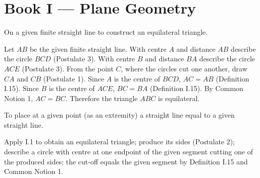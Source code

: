 %
%

\section{Book I --- Plane Geometry}
\label{sec:book-I}

\begin{claim}
\label{prop:I.1}
On a given finite straight line to construct an equilateral triangle.
\end{claim}

\begin{evidence}[Proof of I.1]
\label{ev:I.1}

Let $AB$ be the given finite straight line.  With centre $A$ and
distance $AB$ describe the circle $BCD$ (Postulate 3).  With centre
$B$ and distance $BA$ describe the circle $ACE$ (Postulate 3).  From
the point $C$, where the circles cut one another, draw $CA$ and $CB$
(Postulate 1).  Since $A$ is the centre of $BCD$, $AC = AB$
(Definition I.15).  Since $B$ is the centre of $ACE$, $BC = BA$
(Definition I.15).  By Common Notion 1, $AC = BC$.  Therefore the
triangle $ABC$ is equilateral.
\end{evidence}

\begin{claim}
\label{prop:I.2}
To place at a given point (as an extremity) a straight line equal to a
given straight line.
\end{claim}
\begin{evidence}[Proof of I.2]
\label{ev:I.2}
Apply I.1 to obtain an equilateral triangle; produce its sides
(Postulate 2); describe a circle with centre at one endpoint of the
given segment cutting one of the produced sides; the cut-off equals
the given segment by Definition I.15 and Common Notion 1.
\end{evidence}

